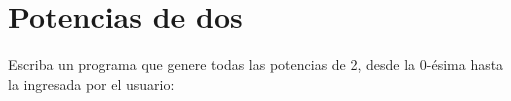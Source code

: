 \section{Potencias de dos}

Escriba un programa que genere todas las potencias de 2, desde la
0-ésima hasta la ingresada por el usuario:
